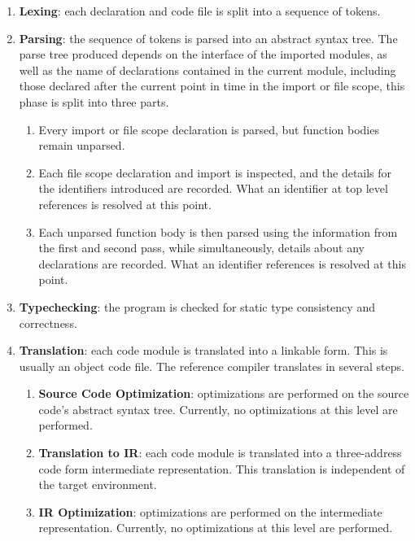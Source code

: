 \documentclass[letterpaper,12pt]{book}
\begin{document}
\begin{enumerate}
	\item \textbf{Lexing}: each declaration and code file is split into a sequence of tokens.

	\item \textbf{Parsing}: the sequence of tokens is parsed into an abstract syntax tree. The parse tree produced depends on the interface of the imported modules, as well as the name of declarations contained in the current module, including those declared after the current point in time in the import or file scope, this phase is split into three parts.
	\begin{enumerate}
		\item Every import or file scope declaration is parsed, but function bodies remain unparsed.
		
		\item Each file scope declaration and import is inspected, and the details for the identifiers introduced are recorded. What an identifier at top level references is resolved at this point.
		
		\item Each unparsed function body is then parsed using the information from the first and second pass, while simultaneously, details about any declarations are recorded. What an identifier references is resolved at this point.
	\end{enumerate}

	\item \textbf{Typechecking}: the program is checked for static type consistency and correctness.
	
	\item \textbf{Translation}: each code module is translated into a linkable form. This is usually an object code file. The reference compiler translates in several steps.
	\begin{enumerate}
		\item \textbf{Source Code Optimization}: optimizations are performed on the source code's abstract syntax tree. Currently, no optimizations at this level are performed.
		
		\item \textbf{Translation to IR}: each code module is translated into a three-address code form intermediate representation. This translation is independent of the target environment.
		
		\item \textbf{IR Optimization}: optimizations are performed on the intermediate representation. Currently, no optimizations at this level are performed.
		

\end{enumerate}
\end{enumerate}
\end{document}
